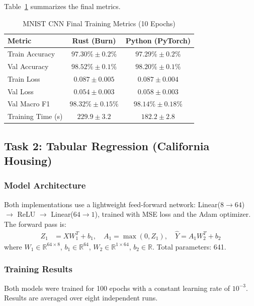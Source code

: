 \documentclass{ieeeaccess}
\begin{document}
Table~\ref{tab:mnist} summarizes the final metrics.

\begin{table}[htbp]
\centering
\caption{MNIST CNN Final Training Metrics (10 Epochs)}
\label{tab:mnist}
\begin{tabular}{|l|c|c|}
\hline
\textbf{Metric} & \textbf{Rust (Burn)} & \textbf{Python (PyTorch)} \\
\hline
Train Accuracy    & $97.30\%{\pm}0.2\%$ & $97.29\%{\pm}0.2\%$ \\
Val Accuracy      & $98.52\%{\pm}0.1\%$ & $98.20\%{\pm}0.1\%$ \\
Train Loss        & $0.087{\pm}0.005$   & $0.087{\pm}0.004$   \\
Val Loss          & $0.054{\pm}0.003$   & $0.058{\pm}0.003$   \\
Val Macro F1      & $98.32\%{\pm}0.15\%$& $98.14\%{\pm}0.18\%$\\
Training Time (s) & $229.9{\pm}3.2$     & $182.2{\pm}2.8$     \\
\hline
\end{tabular}
\end{table}

\FloatBarrier

\subsection{Task 2: Tabular Regression (California Housing)}

\subsubsection{Model Architecture}

Both implementations use a lightweight feed-forward network: Linear($8{\to}64$) ${\to}$ ReLU ${\to}$ Linear($64{\to}1$), trained with MSE loss and the Adam optimizer. The forward pass is:
\begin{align}
    Z_1 &= XW_1^T + b_1, \quad A_1 = \max(0, Z_1), \quad \hat{Y} = A_1 W_2^T + b_2
\end{align}
where $W_1 \in \mathbb{R}^{64 \times 8}$, $b_1 \in \mathbb{R}^{64}$, $W_2 \in \mathbb{R}^{1 \times 64}$, $b_2 \in \mathbb{R}$. Total parameters: 641.

\subsubsection{Training Results}

Both models were trained for 100 epochs with a constant learning rate of $10^{-3}$. Results are averaged over eight independent runs.
\end{document}
